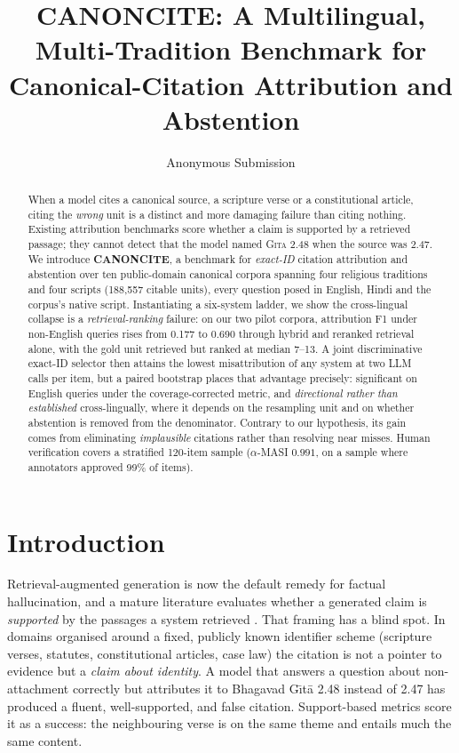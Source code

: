 \documentclass[11pt]{article}
\title{CANONCITE: A Multilingual, Multi-Tradition Benchmark for\\
Canonical-Citation Attribution and Abstention}
\author{Anonymous Submission}
\begin{document}
\maketitle

\begin{abstract}
When a model cites a canonical source, a scripture verse or a
constitutional article, citing the \emph{wrong} unit is a distinct and more damaging failure
than citing nothing. Existing attribution benchmarks score whether a claim is
supported by a retrieved passage; they cannot detect that the model named
\textsc{Gita} 2.48 when the source was 2.47. We introduce \textbf{CANONCITE}, a
benchmark for \emph{exact-ID} citation attribution and abstention over ten
public-domain canonical corpora spanning four religious traditions and four scripts
(188{,}557 citable units), every question posed in English, Hindi and the
corpus's native script. Instantiating a six-system ladder, we show the
cross-lingual collapse is a \emph{retrieval-ranking} failure: on our two pilot corpora,
attribution F1 under non-English queries rises from 0.177 to 0.690 through
hybrid and reranked retrieval alone, with the gold unit retrieved but ranked at median 7--13. A joint
discriminative exact-ID selector then attains the lowest misattribution of any
system at two LLM calls per item, but a paired bootstrap places that
advantage precisely: significant on English queries under the coverage-corrected
metric, and \emph{directional rather than established} cross-lingually, where it
depends on the resampling unit and on whether abstention is removed from the
denominator.
Contrary to our hypothesis, its gain comes from eliminating \emph{implausible}
citations rather than resolving near misses. Human verification covers a
stratified 120-item sample ($\alpha$-MASI $0.991$, on a sample where annotators
approved 99\% of items).
\end{abstract}

\section{Introduction}

Retrieval-augmented generation is now the default remedy for factual
hallucination, and a mature literature evaluates whether a generated claim is
\emph{supported} by the passages a system retrieved
\cite{gao2023alce,bohnet2022aqa,hu2025caqa}. That framing has a blind spot. In
domains organised around a fixed, publicly known identifier scheme (scripture
verses, statutes, constitutional articles, case law) the citation is not a
pointer to evidence but a \emph{claim about identity}. A model that answers a
question about non-attachment correctly but attributes it to
Bhagavad G\={\i}t\={a} 2.48 instead of 2.47 has produced a fluent,
well-supported, and false citation. Support-based metrics score it as a success:
the neighbouring verse is on the same theme and entails much the same content.
\end{document}
